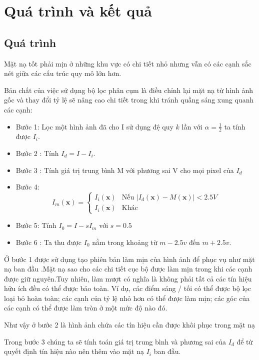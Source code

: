 \documentclass[12pt,letterpaper]{report}
\begin{document}
\section{Quá trình và kết quả}
    
\subsection{Quá trình}
    
Mặt nạ tốt phải mịn ở những khu vực có chi tiết nhỏ nhưng vẫn có các cạnh sắc nét giữa các cấu trúc quy mô lớn hơn.

Bản chất của việc sử dụng bộ lọc phân cụm là điều chỉnh lại mặt nạ từ hình ảnh gốc và thay đổi tỷ lệ sẽ nâng cao chi tiết trong khi tránh quầng sáng xung quanh các cạnh:
	
\begin{itemize}
	\item[] Bước 1: Lọc một hình ảnh đã cho I sử dụng đệ quy $k$ lần với $\alpha=\frac 1 2$ ta tính được $I_i$.
	\item[] Bước 2 : Tính $I_d=I - I_i$.
	\item[] Bước 3 : Tính giá trị trung bình M với phương sai V cho mọi pixel của $I_d$
	\item[] Bước 4: $$I_m(\mathbf x)=\begin{cases}I_i(\mathbf x) &\text{Nếu } |I_d(\mathbf x)-M(\mathbf x)|<2.5V \\I_i(\mathbf x) &\text{Khác}\end{cases}$$
	\item[] Bước 5: Tính $I_0=I-sI_m$ với $s=0.5$
	\item[] Bước 6 : Ta thu được $I_0$ nằm trong khoảng từ $m-2.5v$ đến $m+2.5v$.
\end{itemize}

Ở bước 1 được sử dụng tạo phiên bản làm mịn của hình ảnh để phục vụ như mặt nạ ban đầu .Mặt nạ sao cho các chi tiết cục bộ được làm mịn trong khi các cạnh được giữ nguyên.Tuy nhiên, làm mượt có nghĩa là không phải tất cả các tín hiệu hữu ích đều có thể được bảo toàn. Ví dụ, các điểm sáng / tối có thể được bộ lọc loại bỏ hoàn toàn; các cạnh của tỷ lệ nhỏ hơn có thể được làm mịn; các góc của các cạnh có thể được làm tròn ở một mức độ nào đó.

Như vậy ở bước 2 là hình ảnh chứa các tín hiệu cần được khôi phục trong mặt nạ

Trong bước 3 chúng ta sẽ tính toán giá trị trung bình và phương sai của $I_d$ để từ quyết định tín hiệu nào nên thêm vào mặt nạ $I_i$  ban đầu.
\end{document}
